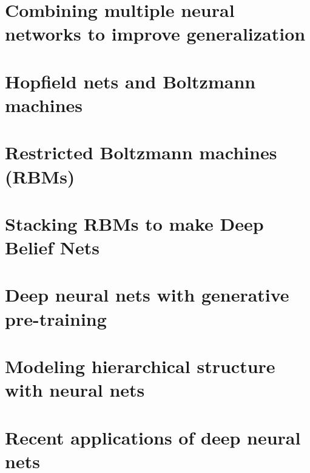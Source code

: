 \documentclass[english, 11pt]{article}
\begin{document}
\section{Combining multiple neural networks to improve generalization}

\section{Hopfield nets and Boltzmann machines}

\section{Restricted Boltzmann machines (RBMs)}

\section{Stacking RBMs to make Deep Belief Nets}

\section{Deep neural nets with generative pre-training}

\section{Modeling hierarchical structure with neural nets}

\section{Recent applications of deep neural nets}
\end{document}
